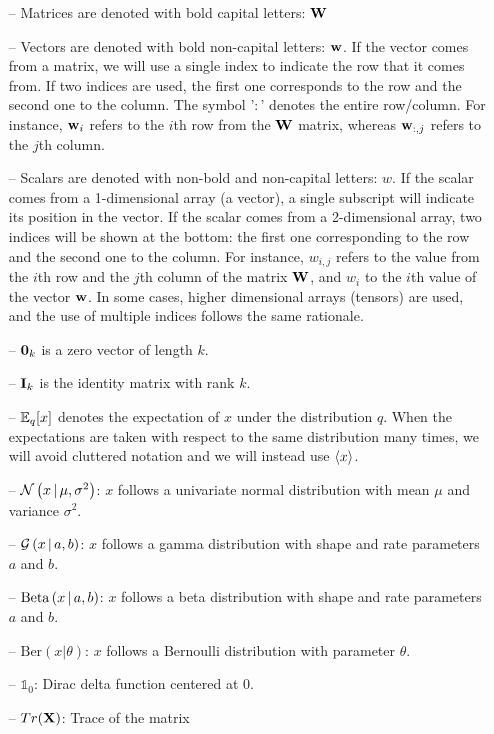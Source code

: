 \begin{itemize}[noitemsep]
	\item[--] Matrices are denoted with bold capital letters: ${\bf W}$
	\item[--] Vectors are denoted with bold non-capital letters: ${\bf w}$. If the vector comes from a matrix, we will use a single index to indicate the row that it comes from. If two indices are used, the first one corresponds to the row and the second one to the column. The symbol '$:$' denotes the entire row/column. For instance, ${\bf w}_{i}$ refers to the $i$th row from the ${\bf W}$ matrix, whereas ${\bf w}_{:,j}$ refers to the $j$th column.
	\item[--] Scalars are denoted with non-bold and non-capital letters: $w$. If the scalar comes from a 1-dimensional array (a vector), a single subscript will indicate its position in the vector. If the scalar comes from a 2-dimensional array, two indices will be shown at the bottom: the first one corresponding to the row and the second one to the column. For instance, $w_{i,j}$ refers to the value from the $i$th row and the $j$th column of the matrix ${\bf W}$, and $w_i$ to the $i$th value of the vector ${\bf w}$. In some cases, higher dimensional arrays (tensors) are used, and the use of multiple indices follows the same rationale.
	\item[--] ${\bf 0}_k$ is a zero vector of length $k$.
	\item[--] ${\bf I}_k$ is the identity matrix with rank $k$.
	\item[--] $\mathbb{E}_q[x]$ denotes the expectation of $x$ under the distribution $q$. When the expectations are taken with respect to the same distribution many times, we will avoid cluttered notation and we will instead use $\langle x \rangle$.
	\item[--] $\mathcal{N}\left(x \,|\, \mu,\sigma^2\right)$: $x$ follows a univariate normal distribution with mean $\mu$ and variance $\sigma^2$.
	\item[--] $\mathcal{G}\left(x \,|\, a,b\right)$: $x$ follows a gamma distribution with shape and rate parameters $a$ and $b$.
	\item[--] $\text{Beta}\left(x \,|\, a, b\right)$: $x$ follows a beta distribution with shape and rate parameters $a$ and $b$.
	\item[--] $\text{Ber}(x|\theta)$: $x$ follows a Bernoulli distribution with parameter $\theta$.
	\item[--] $\mathds{1}_0$: Dirac delta function centered at 0.
	\item[--] $Tr({\bf X})$: Trace of the matrix \bfX
\end{itemize}

